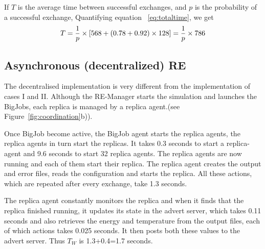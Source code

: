\documentclass{rspublic}
\newcommand{\jhanote}[1]{ {\textcolor{red} { ***shantenu: #1 }}}
\newcommand{\jhanote}[1]{}
\begin{document}
If $T$ is the average time between successful exchanges, and $p$ is
the probability of a successful exchange, Quantifying equation
~\ref{eq:totaltime}, we get
\begin{eqnarray}
T=  {1 \over p} \times {[568 + (0.78 + 0.92)\times 128]} = {1 \over p} \times 786 
\label{eq:timebt}
\end{eqnarray}


\subsection{Asynchronous (decentralized) RE}

The decentralised implementation is very different from the
implementation of cases I and II. Although the RE-Manager starts the
simulation and launches the BigJobs, each replica is managed by a replica agent.(see
Figure~\ref{fig:coordination}b)). %

Once BigJob become active, the BigJob agent starts the replica agents, 
the replica agents in turn start the replicas. It takes 0.3 seconds to start a replica-agent and 9.6 seconds to start 32 replica agents. 
The replica agents are now
running and each of them start their replica. The replica agent creates the output
and error files, reads the configuration and starts the replica. All
these actions, which are repeated after every exchange, take 1.3
seconds.

The replica agent constantly monitors the replica and when it finds
that the replica finished running, it updates its state in the advert
server, which takes 0.11 seconds and also retrieves the energy and
temperature from the output files, each of which actions takes 0.025
seconds. It then posts both these values to the advert server. Thus
$T_W$ is 1.3+0.4=1.7 seconds.
\end{document}
